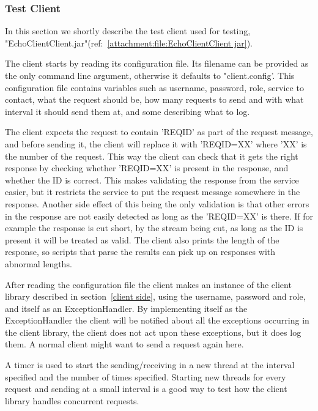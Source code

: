 \subsubsection{Test Client}\label{Testing:About:Client}
    In this section we shortly describe the test client used for testing, "EchoClientClient.jar"(ref:~\ref{attachment:file:EchoClientClient jar}).

    The client starts by reading its configuration file. Its filename can be provided as the only command line argument, otherwise it defaults to "client.config'. This configuration file contains variables such as username, password, role, service to contact, what the request should be, how many requests to send and with what interval it should send them at, and some describing what to log.

    The client expects the request to contain '{REQID}' as part of the request message, and before sending it, the client will replace it with '{REQID=XX}' where 'XX' is the number of the request. This way the client can check that it gets the right response by checking whether '{REQID=XX}' is present in the response, and whether the ID is correct. This makes validating the response from the service easier, but it restricts the service to put the request message somewhere in the response. Another side effect of this being the only validation is that other errors in the response are not easily detected as long as the '{REQID=XX}' is there. If for example the response is cut short, by the stream being cut, as long as the ID is present it will be treated as valid. The client also prints the length of the response, so scripts that parse the results can pick up on responses with abnormal lengths.

    After reading the configuration file the client makes an instance of the client library described in section~\ref{client side}, using the username, password and role, and itself as an ExceptionHandler. By implementing itself as the ExceptionHandler the client will be notified about all the exceptions occurring in the client library, the client does not act upon these exceptions, but it does log them. A normal client might want to send a request again here.
    
    A timer is used to start the sending/receiving in a new thread at the interval specified and the number of times specified. Starting new threads for every request and sending at a small interval is a good way to test how the client library handles concurrent requests.

